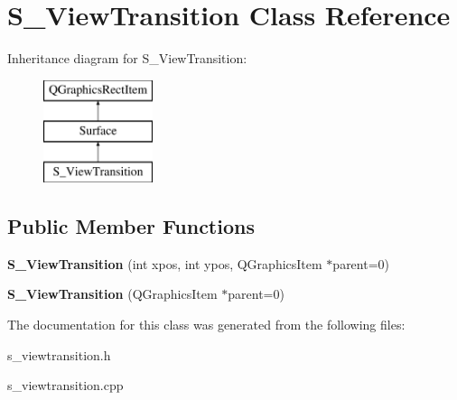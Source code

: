 \hypertarget{class_s___view_transition}{}\section{S\+\_\+\+View\+Transition Class Reference}
\label{class_s___view_transition}
Inheritance diagram for S\+\_\+\+View\+Transition\+:\begin{figure}[H]
\begin{center}
\leavevmode
\includegraphics[height=3.000000cm]{class_s___view_transition}
\end{center}
\end{figure}
\subsection*{Public Member Functions}
\begin{DoxyCompactItemize}
\item 
\hypertarget{class_s___view_transition_a114168f77853ed98ff87d750f2982b39}{}{\bfseries S\+\_\+\+View\+Transition} (int xpos, int ypos, Q\+Graphics\+Item $\ast$parent=0)\label{class_s___view_transition_a114168f77853ed98ff87d750f2982b39}

\item 
\hypertarget{class_s___view_transition_a95dbe7a7f23bb8ed903ad8dff6f7ea6a}{}{\bfseries S\+\_\+\+View\+Transition} (Q\+Graphics\+Item $\ast$parent=0)\label{class_s___view_transition_a95dbe7a7f23bb8ed903ad8dff6f7ea6a}

\end{DoxyCompactItemize}


The documentation for this class was generated from the following files\+:\begin{DoxyCompactItemize}
\item 
s\+\_\+viewtransition.\+h\item 
s\+\_\+viewtransition.\+cpp\end{DoxyCompactItemize}
